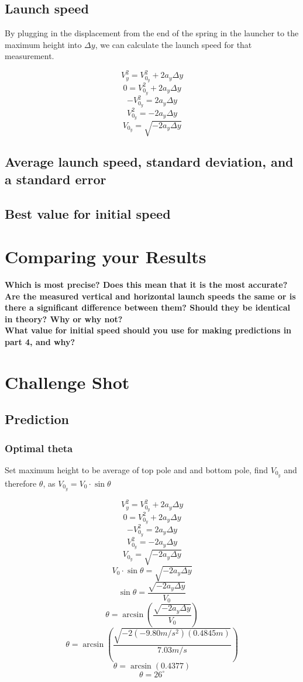 \documentclass[11pt, letterpaper, includehead]{article}
\begin{document}
\subsection{Launch speed} %
By plugging in the displacement from the end of the spring
in the launcher to the maximum height into $\Delta y$, we
can calculate the launch speed for that measurement.

$$V_y^2 = V_{0_y}^2 + 2a_y\Delta y$$
$$0 = V_{0_y}^2 + 2a_y\Delta y$$
$$-V_{0_y}^2 = 2a_y\Delta y$$
$$V_{0_y}^2 = -2a_y\Delta y$$
$$V_{0_y} = \sqrt{-2a_y\Delta y}$$
\subsection{Average launch speed, standard deviation, and a standard error} %
\subsection{Best value for initial speed} %

\section{Comparing your Results} %
\textbf{Which is most precise? Does this mean that it is the most accurate?}\\ 

\textbf{Are the measured vertical and horizontal launch speeds the same or is there a
significant difference between them? Should they be identical in theory? Why or
why not?}\\

\textbf{What value for initial speed should you use for making predictions in part 4, and
why?}

\section{Challenge Shot} %
\subsection{Prediction} %
\subsubsection{Optimal theta} %
Set maximum height to be average of top pole and and bottom pole, find $V_{0_y}$ and therefore $\theta$,
as $V_{0_y} = V_0\cdot\sin\theta$

$$V_y^2 = V_{0_y}^2 + 2a_y\Delta y$$
$$0 = V_{0_y}^2 + 2a_y\Delta y$$
$$-V_{0_y}^2 = 2a_y\Delta y$$
$$V_{0_y}^2 = -2a_y\Delta y$$
$$V_{0_y} = \sqrt{-2a_y\Delta y}$$
$$V_0\cdot\sin\theta = \sqrt{-2a_y\Delta y}$$
$$\sin\theta = \frac{\sqrt{-2a_y\Delta y}}{V_0}$$
$$\theta = \arcsin\left(\frac{\sqrt{-2a_y\Delta y}}{V_0}\right)$$
$$\theta = \arcsin\left(\frac{\sqrt{-2(-9.80m/s^2)(0.4845m)}}{7.03m/s}\right)$$
$$\theta = \arcsin(0.4377)$$
$$\theta = 26^{\circ}$$
\end{document}
